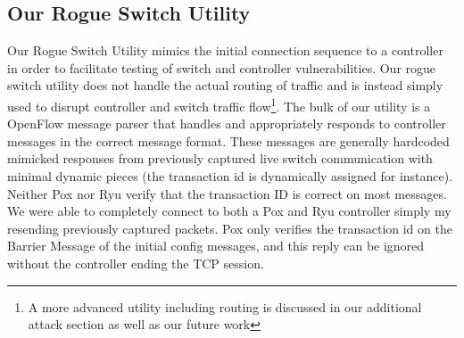 \subsection{Our Rogue Switch Utility}
Our Rogue Switch Utility mimics the initial connection sequence to a controller in order to facilitate testing of switch and controller vulnerabilities. Our rogue switch utility does not handle the actual routing of traffic and is instead simply used to disrupt controller and switch traffic flow\footnote{A more advanced utility including routing is discussed in our additional attack section as well as our future work}. The bulk of our utility is a OpenFlow message parser that handles and appropriately responds to controller messages in the correct message format. These messages are generally hardcoded mimicked responses from previously captured live switch communication with minimal dynamic pieces (the transaction id is dynamically assigned for instance).  Neither Pox nor Ryu verify that the transaction ID is correct on most messages. We were able to completely connect to both a Pox and Ryu controller simply my resending previously captured packets. Pox only verifies the transaction id on the Barrier Message of the initial config messages, and this reply can be ignored without the controller ending the TCP session. 
